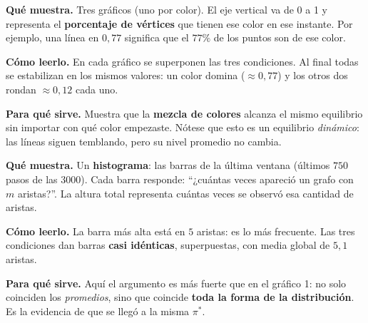 \documentclass[11pt,a4paper]{article}
\newcommand{\E}{|E(G_t)|}
\begin{document}
\begin{tcolorbox}[myblock,title=2--4. Frecuencia de \(C_0\), \(C_1\) y \(C_2\) --- \textit{``¿de qué color se pinta cada cosa?''}]
\textbf{Qué muestra.} Tres gráficos (uno por color). El eje vertical va de 0 a 1
y representa el \textbf{porcentaje de vértices} que tienen ese color en ese
instante. Por ejemplo, una línea en \(0{,}77\) significa que el \(77\%\) de los
puntos son de ese color.

\textbf{Cómo leerlo.} En cada gráfico se superponen las tres condiciones. Al
final todas se estabilizan en los mismos valores: un color domina
(\(\approx0{,}77\)) y los otros dos rondan \(\approx0{,}12\) cada uno.

\textbf{Para qué sirve.} Muestra que la \textbf{mezcla de colores} alcanza el
mismo equilibrio sin importar con qué color empezaste. Nótese que esto es un
equilibrio \emph{dinámico}: las líneas siguen temblando, pero su nivel promedio
no cambia.
\end{tcolorbox}

\begin{tcolorbox}[myblock,title=5. Distribución de \(\E\) en la ventana final --- \textit{``la fotografía del final''}]
\textbf{Qué muestra.} Un \textbf{histograma}: las barras de la última ventana
(últimos \(750\) pasos de las \(3000\)). Cada barra responde: ``¿cuántas veces
apareció un grafo con \(m\) aristas?''. La altura total representa cuántas
veces se observó esa cantidad de aristas.

\textbf{Cómo leerlo.} La barra más alta está en \(5\) aristas: es lo más
frecuente. Las tres condiciones dan barras \textbf{casi idénticas}, superpuestas,
con media global de \(5{,}1\) aristas.

\textbf{Para qué sirve.} Aquí el argumento es más fuerte que en el gráfico 1:
no solo coinciden los \emph{promedios}, sino que coincide \textbf{toda la forma
de la distribución}. Es la evidencia de que se llegó a la misma \(\pi^*\).
\end{tcolorbox}
\end{document}
